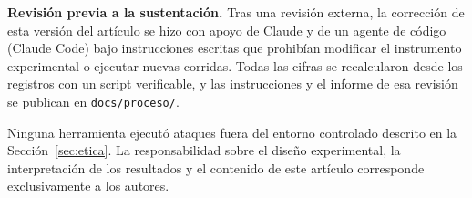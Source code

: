 \documentclass[twocolumn]{article}
\begin{document}
\textbf{Revisión previa a la sustentación.} Tras una revisión externa, la
corrección de esta versión del artículo se hizo con apoyo de Claude y de un
agente de código (Claude Code) bajo instrucciones escritas que prohibían
modificar el instrumento experimental o ejecutar nuevas corridas. Todas las
cifras se recalcularon desde los registros con un script verificable, y las
instrucciones y el informe de esa revisión se publican en
\texttt{docs/proceso/}.

Ninguna herramienta ejecutó ataques fuera del entorno controlado descrito en la
Sección~\ref{sec:etica}. La responsabilidad sobre el diseño experimental, la
interpretación de los resultados y el contenido de este artículo corresponde
exclusivamente a los autores.

\FloatBarrier

\end{document}
